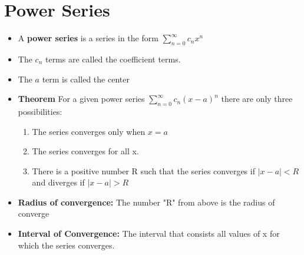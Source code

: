 \documentclass{report}
\begin{document}
	\section{Power Series}
		\begin{itemize}\addtolength{\leftskip}{2em}
			\item A \textbf{power series} is a series in the form $\sum\limits_{n=0}^{\infty}c_nx^n$
			\item The $c_n$ terms are called the coefficient terms.
			\item The $a$ term is called the center
			\item \textbf{Theorem} For a given power series $\sum\limits_{n=0}^{\infty}c_n(x-a)^n$ there are only three possibilities:
			\begin{enumerate}\addtolength{\leftskip}{4em}
				\item The series converges only when $x=a$
				\item The series converges for all x.
				\item There is a positive number R such that the series converges if $|x-a|<R$ and diverges if $|x-a|>R$
			\end{enumerate}
			\item \textbf{Radius of convergence:} The number "R" from above is the radius of converge
			\item \textbf{Interval of Convergence:} The interval that consists all values of x for which the series converges.
		\end{itemize}
\end{document}
